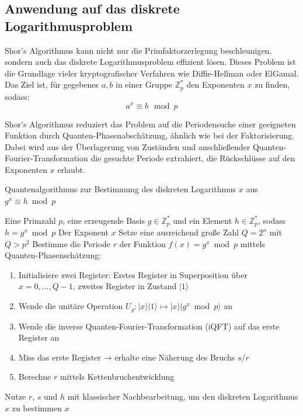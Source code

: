 \subsection{Anwendung auf das diskrete Logarithmusproblem}

Shor’s Algorithmus kann nicht nur die Primfaktorzerlegung beschleunigen, sondern auch das diskrete Logarithmusproblem effizient lösen. Dieses Problem ist die Grundlage vieler kryptografischer Verfahren wie Diffie-Hellman oder ElGamal. \\

\noindent Das Ziel ist, für gegebenes \( a, b \) in einer Gruppe \( \mathbb{Z}_p^* \) den Exponenten \( x \) zu finden, sodass:
\[
a^x \equiv b \mod p
\]

\noindent Shor’s Algorithmus reduziert das Problem auf die Periodensuche einer geeigneten Funktion durch Quanten-Phasenabschätzung, ähnlich wie bei der Faktorisierung. Dabei wird aus der Überlagerung von Zuständen und anschließender Quanten-Fourier-Transformation die gesuchte Periode extrahiert, die Rückschlüsse auf den Exponenten \( x \) erlaubt.\\

\begin{algorithm}
\caption{Quantenalgorithmus zur Bestimmung des diskreten Logarithmus \( x \) aus \( g^x \equiv h \bmod p \)}
\begin{algorithmic}[1]
\Require Eine Primzahl \( p \), eine erzeugende Basis \( g \in \mathbb{Z}_p^* \) und ein Element \( h \in \mathbb{Z}_p^* \), sodass \( h = g^x \bmod p \)
\Ensure Der Exponent \( x \)
\State Setze eine ausreichend große Zahl \( Q = 2^n \) mit \( Q > p^2 \)
\State Bestimme die Periode \( r \) der Funktion \( f(x) = g^x \bmod p \) mittels Quanten-Phasenschätzung:
    \begin{enumerate}
        \item Initialisiere zwei Register: Erstes Register in Superposition über \( x = 0, \ldots, Q-1 \), zweites Register in Zustand \( |1\rangle \)
        \item Wende die unitäre Operation \( U_g \colon |x\rangle|1\rangle \mapsto |x\rangle|g^x \bmod p\rangle \) an
        \item Wende die inverse Quanten-Fourier-Transformation (iQFT) auf das erste Register an
        \item Miss das erste Register → erhalte eine Näherung des Bruchs \( s/r \)
        \item Berechne \( r \) mittels Kettenbruchentwicklung
    \end{enumerate}
\State Nutze \( r \), \( s \) und \( h \) mit klassischer Nachbearbeitung, um den diskreten Logarithmus \( x \) zu bestimmen
\State \Return \( x \)
\end{algorithmic}
\end{algorithm}

